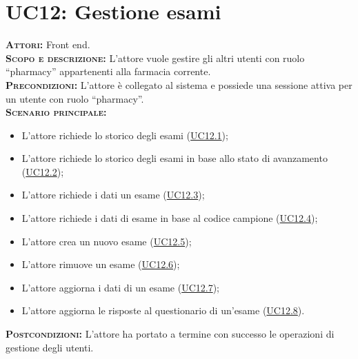 \section{UC12: Gestione esami}
\label{sec:UC11}
\textsc{\textbf{Attori:}} Front end.\\
\textsc{\textbf{Scopo e descrizione:}} L'attore vuole gestire gli altri utenti con ruolo ``pharmacy'' appartenenti alla farmacia corrente.\\
\textsc{\textsc{\textbf{Precondizioni:}}} L'attore è collegato al sistema e possiede una sessione attiva per un utente con ruolo ``pharmacy''.\\
\textsc{\textbf{Scenario principale:}}
\begin{itemize}
    \item L'attore richiede lo storico degli esami (\hyperref[sec:UC121]{UC12.1});
    \item L'attore richiede lo storico degli esami in base allo stato di avanzamento (\hyperref[sec:UC122]{UC12.2});
    \item L'attore richiede i dati un esame (\hyperref[sec:UC123]{UC12.3});
    \item L'attore richiede i dati di esame in base al codice campione (\hyperref[sec:UC124]{UC12.4});
    \item L'attore crea un nuovo esame (\hyperref[sec:UC125]{UC12.5});
    \item L'attore rimuove un esame (\hyperref[sec:UC126]{UC12.6});
    \item L'attore aggiorna i dati di un esame (\hyperref[sec:UC127]{UC12.7});
    \item L'attore aggiorna le risposte al questionario di un'esame (\hyperref[sec:UC128]{UC12.8}).
\end{itemize}
\textsc{\textbf{Postcondizioni:}} L'attore ha portato a termine con successo le operazioni di gestione degli utenti.

